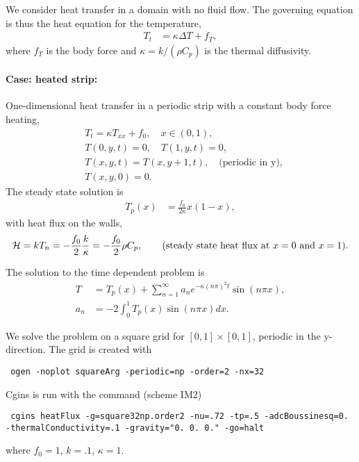  We consider heat transfer in a domain with no fluid flow. The governing equation is
thus the heat equation for the temperature,
\begin{align}
    T_t &= \kappa \Delta T + f_T, 
\end{align}
where $f_T$ is the body force and $\kappa=k/(\rho C_p)$ is the thermal diffusivity.


\paragraph{Case: heated strip:} One-dimensional heat transfer in a periodic strip with a constant body force heating, 
\begin{align}
   & T_t = \kappa T_{xx} + f_0 , \quad x\in(0,1), \\
   & T(0,y,t)=0, \quad  T(1,y,t)=0, \\
   & T(x,y,t)=T(x,y+1,t), \quad \text{(periodic in y)}, \\
   & T(x,y,0)=0.
\end{align}
The steady state solution is
\begin{align}
    T_p(x) &= \frac{f_0}{2 \kappa} x (1-x ), 
\end{align}
with heat flux on the walls,
\begin{align}
   {\mathcal H} =  k T_n = - \frac{f_0}{2}\frac{k}{\kappa} = - \frac{f_0}{2} \rho C_p, \qquad \text{(steady state heat flux at $x=0$ and $x=1$)}.
\end{align}

The solution to the time dependent problem is 
\begin{align}
    T &= T_p(x) + \sum_{n=1}^\infty a_n e^{-\kappa (n\pi)^2 t} \sin(n\pi x), \label{eq:squareHeatSolution} \\
    a_n &= -2 \int_0^1 T_p(x) \sin(n\pi x) dx. 
\end{align}


We solve the problem on a square grid for $[0,1]\times[0,1]$, periodic in the y-direction.
The grid is created with
\begin{flushleft}\tt\small
  ogen -noplot squareArg -periodic=np -order=2 -nx=32
\end{flushleft}
Cgins is run with the command (scheme IM2)
\begin{flushleft}\tt\small
  cgins heatFlux -g=square32np.order2 -nu=.72 -tp=.5 -adcBoussinesq=0. -thermalConductivity=.1 -gravity="0. 0. 0." -go=halt
\end{flushleft}
where $f_0=1$, $k=.1$, $\kappa=1$.

